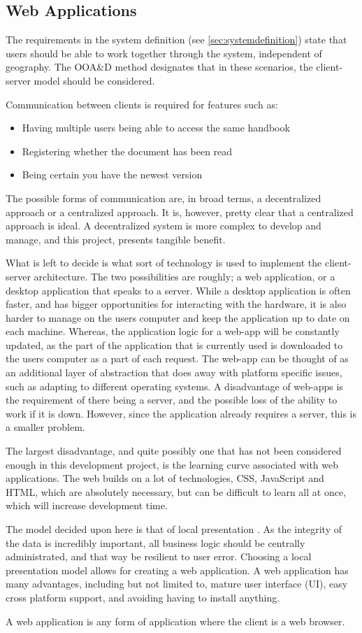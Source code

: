 \subsection{Web Applications}
The requirements in the system definition (see \cref{sec:systemdefinition}) state that users should be able to work together through the system, independent of geography.
The OOA\&D method designates that in these scenarios, the client-server model should be considered. \citep[p.~202]{Rod-Aalborg}

Communication between clients is required for features such as:
\begin{itemize}
\item Having multiple users being able to access the same handbook
\item Registering whether the document has been read
\item Being certain you have the newest version
\end{itemize}

The possible forms of communication are, in broad terms, a decentralized approach or a centralized approach.
It is, however, pretty clear that a centralized approach is ideal.
A decentralized system is more complex to develop and manage, and this project, presents tangible benefit.

What is left to decide is what sort of technology is used to implement the client-server architecture.
The two possibilities are roughly; a web application, or a desktop application that speaks to a server.
While a desktop application is often faster, and has bigger opportunities for interacting with the hardware, it is also harder to manage on the users computer and keep the application up to date on each machine.
Whereas, the application logic for a web-app will be constantly updated, as the part of the application that is currently used is downloaded to the users computer as a part of each request.
The web-app can be thought of as an additional layer of abstraction that does away with platform specific issues, such as adapting to different operating systems.
A disadvantage of web-apps is the requirement of there being a server, and the possible loss of the ability to work if it is down.
However, since the application already requires a server, this is a smaller problem.

The largest disadvantage, and quite possibly one that has not been considered enough in this development project, is the learning curve associated with web applications.
The web builds on a lot of technologies, CSS, JavaScript and HTML, which are absolutely necessary, but can be difficult to learn all at once, which will increase development time.

The model decided upon here is that of local presentation \citep[p.~202]{Rod-Aalborg}.
As the integrity of the data is incredibly important, all business logic should be centrally administrated, and that way be resilient to user error.
Choosing a local presentation model allows for creating a web application.
A web application has many advantages, including but not limited to, mature user interface (UI), easy cross platform support, and avoiding having to install anything.

A web application is any form of application where the client is a web browser.
